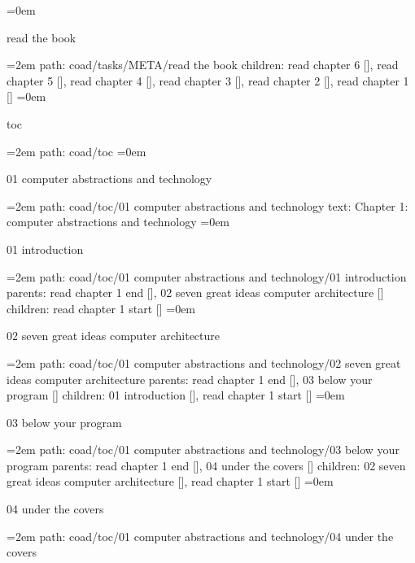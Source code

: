 \leftskip=0em
\par\endgroup
\bigskip
{}
read the book
\smallskip
\par\begingroup
\leftskip=2em
path: coad/tasks/META/read the book
\smallskip
children: read chapter 6 [], read chapter 5 [], read chapter 4 [], read chapter 3 [], read chapter 2 [], read chapter 1 []
\smallskip
\leftskip=0em
\par\endgroup
\bigskip
{}
toc
\smallskip
\par\begingroup
\leftskip=2em
path: coad/toc
\smallskip
\leftskip=0em
\par\endgroup
\bigskip
{}
01 computer abstractions and technology
\smallskip
\par\begingroup
\leftskip=2em
path: coad/toc/01 computer abstractions and technology
\smallskip
text:  Chapter 1: computer abstractions and technology
\smallskip
\leftskip=0em
\par\endgroup
\bigskip
{}
01 introduction
\smallskip
\par\begingroup
\leftskip=2em
path: coad/toc/01 computer abstractions and technology/01 introduction
\smallskip
parents:  read chapter 1 end [], 02 seven great ideas computer architecture []
\smallskip
children: read chapter 1 start []
\smallskip
\leftskip=0em
\par\endgroup
\bigskip
{}
02 seven great ideas computer architecture
\smallskip
\par\begingroup
\leftskip=2em
path: coad/toc/01 computer abstractions and technology/02 seven great ideas computer architecture
\smallskip
parents:  read chapter 1 end [], 03 below your program []
\smallskip
children: 01 introduction [], read chapter 1 start []
\smallskip
\leftskip=0em
\par\endgroup
\bigskip
{}
03 below your program
\smallskip
\par\begingroup
\leftskip=2em
path: coad/toc/01 computer abstractions and technology/03 below your program
\smallskip
parents:  read chapter 1 end [], 04 under the covers []
\smallskip
children: 02 seven great ideas computer architecture [], read chapter 1 start []
\smallskip
\leftskip=0em
\par\endgroup
\bigskip
{}
04 under the covers
\smallskip
\par\begingroup
\leftskip=2em
path: coad/toc/01 computer abstractions and technology/04 under the covers
